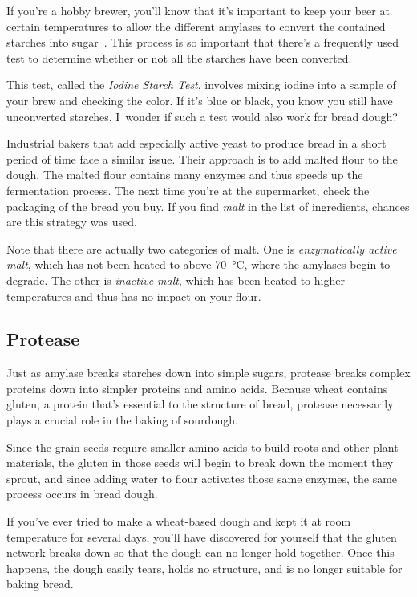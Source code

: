 If you're a hobby brewer, you'll know that it's important to keep your beer at
certain temperatures to allow the different amylases to convert the contained
starches into sugar~\cite{beer+amylase}. This process is so important that
there's a frequently used test to determine whether or not all the starches
have been converted.

This test, called the \emph{Iodine Starch Test}, involves mixing iodine into
a sample of your brew and checking the color. If it's blue or black, you know
you still have unconverted starches. I~wonder if such a test would also work
for bread dough?

Industrial bakers that add especially active yeast to produce bread in a short
period of time face a similar issue. Their approach is to add malted flour to
the dough. The malted flour contains many enzymes and thus speeds up the
fermentation process. The next time you're at the supermarket, check the
packaging of the bread you buy. If you find \emph{malt} in the list of
ingredients, chances are this strategy was used.

Note that there are actually two categories of malt. One is \emph{enzymatically
active malt}, which has not been heated to above  \qty{70}{\degreeCelsius}, where the amylases begin
to degrade. The other is \emph{inactive malt}, which has been heated to higher
temperatures and thus has no impact on your flour.

\subsection{Protease}

Just as amylase breaks starches down into simple sugars, protease breaks
complex proteins down into simpler proteins and amino acids. Because wheat
contains gluten, a protein that's essential to the structure of bread,
protease necessarily plays a crucial role in the baking of sourdough.

Since the grain seeds require smaller amino acids to build roots and other
plant materials, the gluten in those seeds will begin to break down the moment
they sprout, and since adding water to flour activates those same enzymes,
the same process occurs in bread dough.

If you've ever tried to make a wheat-based dough and kept it at room
temperature for several days, you'll have discovered for yourself that the
gluten network breaks down so that the dough can no longer hold together. Once
this happens, the dough easily tears, holds no structure, and is no
longer suitable for baking bread.

